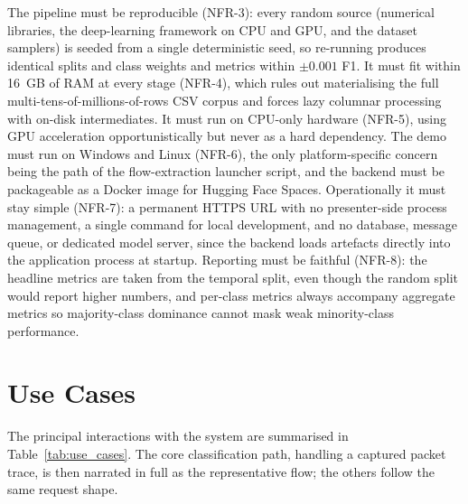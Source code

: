 \par The pipeline must be reproducible (NFR-3): every random source (numerical libraries, the deep-learning framework on CPU and GPU, and the dataset samplers) is seeded from a single deterministic seed, so re-running produces identical splits and class weights and metrics within $\pm 0.001$ F1. It must fit within 16~GB of RAM at every stage (NFR-4), which rules out materialising the full multi-tens-of-millions-of-rows CSV corpus and forces lazy columnar processing with on-disk intermediates. It must run on CPU-only hardware (NFR-5), using GPU acceleration opportunistically but never as a hard dependency. The demo must run on Windows and Linux (NFR-6), the only platform-specific concern being the path of the flow-extraction launcher script, and the backend must be packageable as a Docker image for Hugging Face Spaces. Operationally it must stay simple (NFR-7): a permanent HTTPS URL with no presenter-side process management, a single command for local development, and no database, message queue, or dedicated model server, since the backend loads artefacts directly into the application process at startup. Reporting must be faithful (NFR-8): the headline metrics are taken from the temporal split, even though the random split would report higher numbers, and per-class metrics always accompany aggregate metrics so majority-class dominance cannot mask weak minority-class performance.

\section{Use Cases}
\label{sec:use_cases}

\par The principal interactions with the system are summarised in Table~\ref{tab:use_cases}. The core classification path, handling a captured packet trace, is then narrated in full as the representative flow; the others follow the same request shape.

